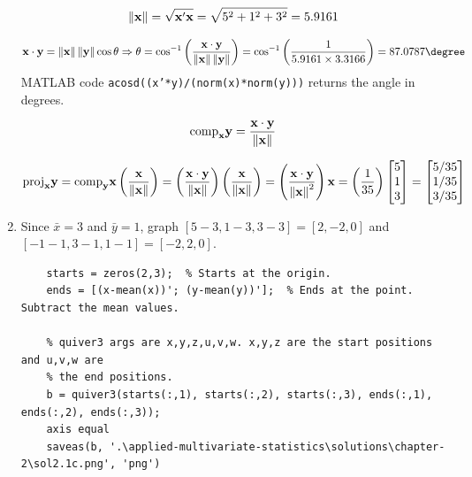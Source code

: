 \begin{enumerate}[label=(\alph*)]
\[
    \|\bold{x}\| = \sqrt{\bold{x}^\prime \bold{x}} = \sqrt{5^2 + 1^2 + 3^2} = 5.9161
\]

\[
    \bold{x} \cdot \bold{y} = \left\|\bold{x}\right\| \left\|\bold{y}\right\| \cos{\theta} 
    \Rightarrow \theta = \cos^{-1}{\left(\frac{\bold{x} \cdot \bold{y}}{\left\|\bold{x}\right\| \left\|\bold{y}\right\|}\right)} = \cos^{-1}{\left(\frac{1}{5.9161 \times 3.3166}\right)} = 87.0787 \degree
\]
MATLAB code \texttt{acosd((x'*y)/(norm(x)*norm(y)))} returns the angle in degrees.

\[
    \text{comp}_{\bold{x}}\bold{y} = \frac{\bold{x} \cdot \bold{y}}{\left\| \bold{x} \right\|}
\]

\[
    \text{proj}_{\bold{x}}\bold{y} = \text{comp}_{\bold{y}}\bold{x}\left(\frac{\bold{x}}{\left\|\bold{x}\right\|}\right) = \left(\frac{\bold{x} \cdot \bold{y}}{\left\| \bold{x} \right\|}\right) \left(\frac{\bold{x}}{\left\| \bold{x} \right\|}\right) = \left(\frac{\bold{x} \cdot \bold{y}}{\left\| \bold{x} \right\|^2}\right) \bold{x} = \left(\frac{1}{35}\right) \begin{bmatrix}
        5 \\
        1 \\
        3
    \end{bmatrix} =
    \begin{bmatrix}
        5/35 \\
        1/35 \\
        3/35
    \end{bmatrix}
\]

            \item Since $\bar{x} = 3$ and $\bar{y} = 1$, graph $[5-3, 1-3, 3-3] = [2, -2, 0]$ and $[-1-1, 3-1, 1-1] = [-2,2,0]$.
            
        \begin{lstlisting}
    starts = zeros(2,3);  % Starts at the origin.
    ends = [(x-mean(x))'; (y-mean(y))'];  % Ends at the point. Subtract the mean values.
    
    % quiver3 args are x,y,z,u,v,w. x,y,z are the start positions and u,v,w are
    % the end positions.
    b = quiver3(starts(:,1), starts(:,2), starts(:,3), ends(:,1), ends(:,2), ends(:,3));
    axis equal
    saveas(b, '.\applied-multivariate-statistics\solutions\chapter-2\sol2.1c.png', 'png')
        \end{lstlisting}


\end{enumerate}
